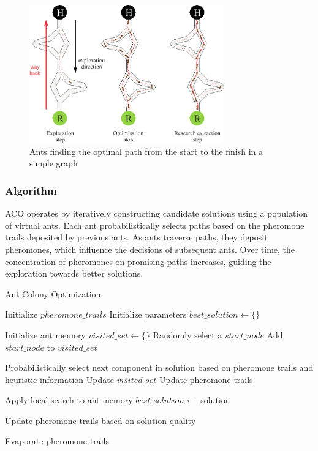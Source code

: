 \documentclass{article}
\begin{document}
\begin{figure}[h]
    \centering
    \includegraphics[width=0.75\textwidth,keepaspectratio]{Images/aco.jpg}
    \caption{Ants finding the optimal path from the start to the finish in a simple graph}
    \label{fig:ant}
\end{figure}

\subsubsection{Algorithm}
ACO operates by iteratively constructing candidate solutions using a population of virtual ants. Each ant probabilistically selects paths based on the pheromone trails deposited by previous ants. As ants traverse paths, they deposit pheromones, which influence the decisions of subsequent ants. Over time, the concentration of pheromones on promising paths increases, guiding the exploration towards better solutions.
\begin{algorithm}[!h]
    \DontPrintSemicolon
    \caption{Ant Colony Optimization}
    \label{alg:aco}
    \KwResult{}

    Initialize $pheromone\_trails$\;
    Initialize parameters\;
    $best\_solution\gets\{\}$\;
    {
        {
            Initialize ant memory\;
            $visited\_set\gets\{\}$\;
            Randomly select a $start\_node$\;
            Add $start\_node$ to $visited\_set$\;

            {
                Probabilistically select next component in solution based on pheromone trails and heuristic information\;
                Update $visited\_set$\;
                Update pheromone trails\;
            }
        
            Apply local search to ant memory\;
            {
                $best\_solution\gets$ solution\;
            }
        
            Update pheromone trails based on solution quality\;
        }
        Evaporate pheromone trails\;
    }
    
\end{algorithm}
\end{document}
